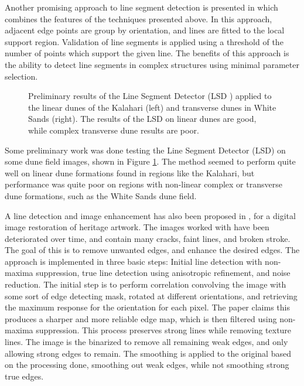 Another promising approach to line segment detection is presented in \cite{2010_lsd_fast_line_segment_detector} which combines the features of the techniques presented above. In this approach, adjacent edge points are group by orientation, and lines are fitted to the local support region. Validation of line segments is applied using a threshold of the number of points which support the given line. The benefits of this approach is the ability to detect line segments in complex structures using minimal parameter selection. 

\begin{figure}
	\centering
	\caption{Preliminary results of the Line Segment Detector (LSD \cite{2010_lsd_fast_line_segment_detector}) applied to the linear dunes of the Kalahari (left) and transverse dunes in White Sands (right). The results of the LSD on linear dunes are good, while complex transverse dune results are poor.}
	\label{fig:lsd_results}
\end{figure}

Some preliminary work was done testing the Line Segment Detector (LSD) on some dune field images, shown in Figure \ref{fig:lsd_results}. The method seemed to perform quite well on linear dune formations found in regions like the Kalahari, but performance was quite poor on regions with non-linear complex or transverse dune formations, such as the White Sands dune field.

A line detection and image enhancement has also been proposed in \cite{Robust_Faint_Line_Detection_Enhancement_Algorithm}, for a digital image restoration of heritage artwork. The images worked with have been deteriorated over time, and contain many cracks, faint lines, and broken stroke. The goal of this is to remove unwanted edges, and enhance the desired edges. The approach is implemented in three basic steps: Initial line detection with non-maxima suppression, true line detection using anisotropic refinement, and noise reduction. The initial step is to perform correlation convolving the image with some sort of edge detecting mask, rotated at different orientations, and retrieving the maximum response for the orientation	for each pixel. The paper claims this produces a sharper and more reliable edge map, which is then filtered using non-maxima suppression. This process preserves strong lines while removing texture lines. The image is the binarized to remove all remaining weak edges, and only allowing strong edges to remain. The smoothing is applied to the original based on the processing done, smoothing out weak edges, while not smoothing strong true edges.

